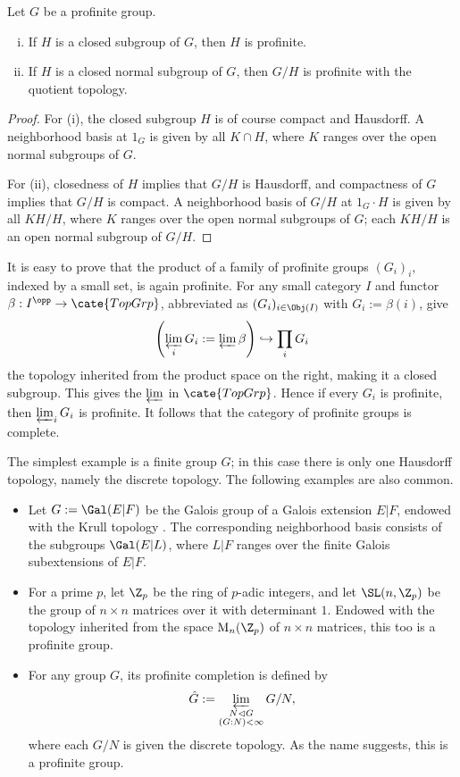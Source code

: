 \begin{proposition}
	Let $G$ be a profinite group.
	\begin{enumerate}[(i)]
		\item If $H$ is a closed subgroup of $G$, then $H$ is profinite.
		\item If $H$ is a closed normal subgroup of $G$, then $G/H$ is profinite with the quotient topology.
	\end{enumerate}
\end{proposition}
\begin{proof}
	For (i), the closed subgroup $H$ is of course compact and Hausdorff. A neighborhood basis at $1_G$ is given by all $K\cap H$, where $K$ ranges over the open normal subgroups of $G$.

	For (ii), closedness of $H$ implies that $G/H$ is Hausdorff, and compactness of $G$ implies that $G/H$ is compact. A neighborhood basis of $G/H$ at $1_G\cdot H$ is given by all $KH/H$, where $K$ ranges over the open normal subgroups of $G$; each $KH/H$ is an open normal subgroup of $G/H$.
\end{proof}

It is easy to prove that the product of a family of profinite groups $(G_i)_i$, indexed by a small set, is again profinite. For any small category $I$ and functor $\beta:I^{\opp}\to\cate{TopGrp}$, abbreviated as $(G_i)_{i\in\Obj(I)}$ with $G_i:=\beta(i)$, give
\[ \left( \varprojlim_i G_i := \varprojlim \beta \right) \hookrightarrow \prod_i G_i \]
the topology inherited from the product space on the right, making it a closed subgroup. This gives the $\varprojlim$ in $\cate{TopGrp}$. Hence if every $G_i$ is profinite, then $\varprojlim_iG_i$ is profinite. It follows that the category of profinite groups is complete.

\begin{example}
	The simplest example is a finite group $G$; in this case there is only one Hausdorff topology, namely the discrete topology. The following examples are also common.
	\begin{itemize}
		\item Let $G:=\Gal(E|F)$ be the Galois group of a Galois extension $E|F$, endowed with the Krull topology \cite[\S 9.2]{Li1}. The corresponding neighborhood basis consists of the subgroups $\Gal(E|L)$, where $L|F$ ranges over the finite Galois subextensions of $E|F$.

		\item For a prime $p$, let $\Z_p$ be the ring of $p$-adic integers, and let $\SL(n,\Z_p)$ be the group of $n\times n$ matrices over it with determinant $1$. Endowed with the topology inherited from the space $\mathrm{M}_n(\Z_p)$ of $n\times n$ matrices, this too is a profinite group.

		\item For any group $G$, its profinite completion is defined by
		\[ \hat{G} := \varprojlim_{\substack{N \lhd G \\ (G:N) < \infty}} G/N, \]
		where each $G/N$ is given the discrete topology. As the name suggests, this is a profinite group.
	\end{itemize}
\end{example}

